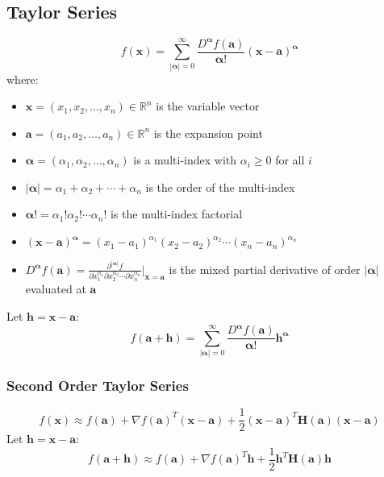 \documentclass{article}
\begin{document}
\subsection{Taylor Series}

\[
    f(\mathbf{x}) = \sum_{|\boldsymbol{\alpha}|=0}^{\infty} \frac{D^{\boldsymbol{\alpha}} f(\mathbf{a})}{\boldsymbol{\alpha}!} (\mathbf{x} - \mathbf{a})^{\boldsymbol{\alpha}}
\]
where:
\begin{itemize}
    \item $\mathbf{x} = (x_1, x_2, \ldots, x_n) \in \mathbb{R}^n$ is the variable vector
    \item $\mathbf{a} = (a_1, a_2, \ldots, a_n) \in \mathbb{R}^n$ is the expansion point
    \item $\boldsymbol{\alpha} = (\alpha_1, \alpha_2, \ldots, \alpha_n)$ is a multi-index with $\alpha_i \geq 0$ for all $i$
    \item $|\boldsymbol{\alpha}| = \alpha_1 + \alpha_2 + \cdots + \alpha_n$ is the order of the multi-index
    \item $\boldsymbol{\alpha}! = \alpha_1! \alpha_2! \cdots \alpha_n!$ is the multi-index factorial
    \item $(\mathbf{x} - \mathbf{a})^{\boldsymbol{\alpha}} = (x_1 - a_1)^{\alpha_1} (x_2 - a_2)^{\alpha_2} \cdots (x_n - a_n)^{\alpha_n}$
    \item $D^{\boldsymbol{\alpha}} f(\mathbf{a}) = \frac{\partial^{|\boldsymbol{\alpha}|} f}{\partial x_1^{\alpha_1} \partial x_2^{\alpha_2} \cdots \partial x_n^{\alpha_n}}\bigg|_{\mathbf{x}=\mathbf{a}}$ is the mixed partial derivative of order $|\boldsymbol{\alpha}|$ evaluated at $\mathbf{a}$
\end{itemize}
Let $\mathbf{h} = \mathbf{x} - \mathbf{a}$:
\[
    f(\mathbf{a} + \mathbf{h}) = \sum_{|\boldsymbol{\alpha}|=0}^{\infty} \frac{D^{\boldsymbol{\alpha}} f(\mathbf{a})}{\boldsymbol{\alpha}!} \mathbf{h}^{\boldsymbol{\alpha}}
\]

\subsubsection{Second Order Taylor Series}
\[
    f(\mathbf{x}) \approx f(\mathbf{a}) + \nabla f(\mathbf{a})^T (\mathbf{x}-\mathbf{a}) + \frac{1}{2} (\mathbf{x}-\mathbf{a})^T \mathbf{H}(\mathbf{a}) (\mathbf{x}-\mathbf{a})
\]
Let $\mathbf{h} = \mathbf{x} - \mathbf{a}$:
\[
    f(\mathbf{a} + \mathbf{h}) \approx f(\mathbf{a}) + \nabla f(\mathbf{a})^T \mathbf{h} + \frac{1}{2} \mathbf{h}^T \mathbf{H}(\mathbf{a}) \mathbf{h}
\]
\end{document}
